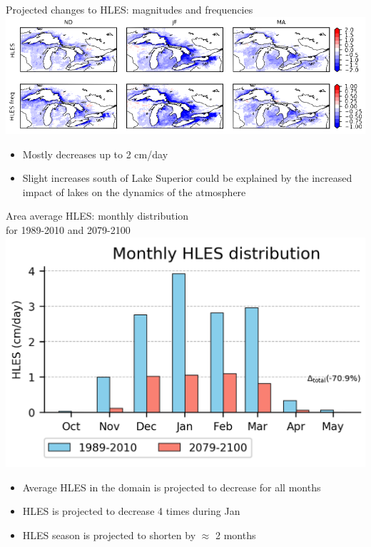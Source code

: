 \documentclass{beamer}
\begin{document}
  \begin{frame}{Projected changes to HLES: magnitudes and frequencies}
    \includegraphics[width=\textwidth]{projected_changes_to_hles.png}
    \begin{itemize}
      \item Mostly decreases up to 2 cm/day
      \item Slight increases south of Lake Superior could be explained by the increased impact of lakes on the dynamics of the atmosphere
    \end{itemize}
  \end{frame}


  \begin{frame}{Area average HLES: monthly distribution\\for 1989-2010 and 2079-2100}
    \centering
    \includegraphics[height=0.55\textheight]{hles_snow_histo_cc_m10_11_12_1_2_3_4_5_domain}
    \begin{itemize}
      \item Average HLES in the domain is projected to decrease for all months
      \item HLES is projected to decrease 4 times during Jan
      \item HLES season is projected to shorten by $\approx$ 2 months
    \end{itemize}
  \end{frame}
\end{document}

